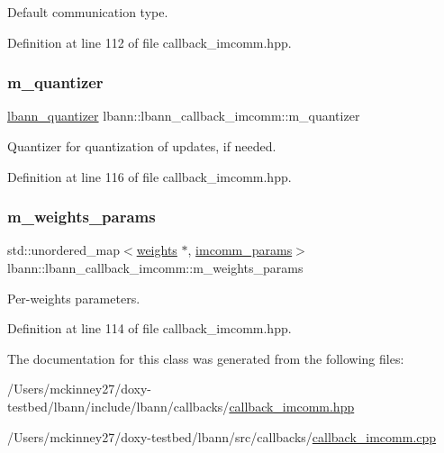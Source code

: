 Default communication type. 

Definition at line 112 of file callback\+\_\+imcomm.\+hpp.

\mbox{\label{classlbann_1_1lbann__callback__imcomm_a4994863d7f69e801c042c5d460bb3f34}} 
\subsubsection{\texorpdfstring{m\+\_\+quantizer}{m\_quantizer}}
{\footnotesize\ttfamily \hyperlink{classlbann_1_1lbann__quantizer}{lbann\+\_\+quantizer} lbann\+::lbann\+\_\+callback\+\_\+imcomm\+::m\+\_\+quantizer\hspace{0.3cm}{\ttfamily [private]}}

Quantizer for quantization of updates, if needed. 

Definition at line 116 of file callback\+\_\+imcomm.\+hpp.

\mbox{\label{classlbann_1_1lbann__callback__imcomm_a32a0319c91aff324cb3468de4f31dd50}} 
\subsubsection{\texorpdfstring{m\+\_\+weights\+\_\+params}{m\_weights\_params}}
{\footnotesize\ttfamily std\+::unordered\+\_\+map$<$\hyperlink{classlbann_1_1weights}{weights} $\ast$, \hyperlink{structlbann_1_1lbann__callback__imcomm_1_1imcomm__params}{imcomm\+\_\+params}$>$ lbann\+::lbann\+\_\+callback\+\_\+imcomm\+::m\+\_\+weights\+\_\+params\hspace{0.3cm}{\ttfamily [private]}}

Per-\/weights parameters. 

Definition at line 114 of file callback\+\_\+imcomm.\+hpp.



The documentation for this class was generated from the following files\+:\begin{DoxyCompactItemize}
\item 
/\+Users/mckinney27/doxy-\/testbed/lbann/include/lbann/callbacks/\hyperlink{callback__imcomm_8hpp}{callback\+\_\+imcomm.\+hpp}\item 
/\+Users/mckinney27/doxy-\/testbed/lbann/src/callbacks/\hyperlink{callback__imcomm_8cpp}{callback\+\_\+imcomm.\+cpp}\end{DoxyCompactItemize}
